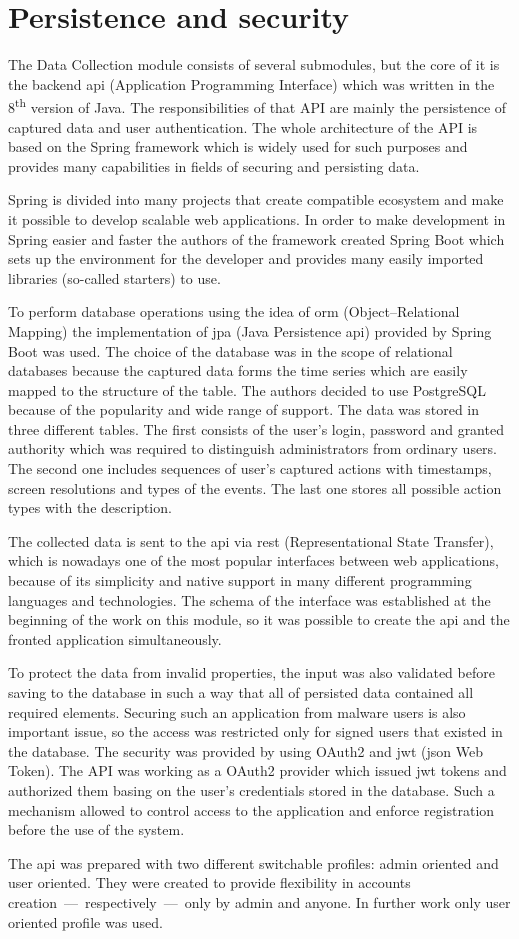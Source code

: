 \section{Persistence and security}\label{sec:persistence-and-security}
The Data Collection module consists of several submodules, but the core of it is the backend \gls{api} (Application Programming Interface) which was written in the 8\textsuperscript{th} version of Java.
The responsibilities of that API are mainly the persistence of captured data and user authentication.
The whole architecture of the API is based on the Spring framework which is widely used for such purposes and provides many capabilities in fields of securing and persisting data.

Spring is divided into many projects that create compatible ecosystem and make it possible to develop scalable web applications.
In order to make development in Spring easier and faster the authors of the framework created Spring Boot which sets up the environment for the developer and provides many easily imported libraries (so-called starters) to use.

To perform database operations using the idea of \gls{orm} (Object–Relational Mapping) the implementation of \gls{jpa} (Java Persistence \gls{api}) provided by Spring Boot was used.
The choice of the database was in the scope of relational databases because the captured data forms the time series which are easily mapped to the structure of the table.
The authors decided to use PostgreSQL because of the popularity and wide range of support.
The data was stored in three different tables.
The first consists of the user's login, password and granted authority which was required to distinguish administrators from ordinary users.
The second one includes sequences of user's captured actions with timestamps, screen resolutions and types of the events.
The last one stores all possible action types with the description.

The collected data is sent to the \gls{api} via \gls{rest} (Representational State Transfer), which is nowadays one of the most popular interfaces between web applications, because of its simplicity and native support in many different programming languages and technologies.
The schema of the interface was established at the beginning of the work on this module, so it was possible to create the \gls{api} and the fronted application simultaneously.

To protect the data from invalid properties, the input was also validated before saving to the database in such a way that all of persisted data contained all required elements.
Securing such an application from malware users is also important issue, so the access was restricted only for signed users that existed in the database.
The security was provided by using OAuth2 and \gls{jwt} (\gls{json} Web Token).
The API was working as a OAuth2 provider which issued \gls{jwt} tokens and authorized them basing on the user's credentials stored in the database.
Such a mechanism allowed to control access to the application and enforce registration before the use of the system.

The \gls{api} was prepared with two different switchable profiles: admin oriented and user oriented.
They were created to provide flexibility in accounts creation~---~respectively~---~only by admin and anyone.
In further work only user oriented profile was used.